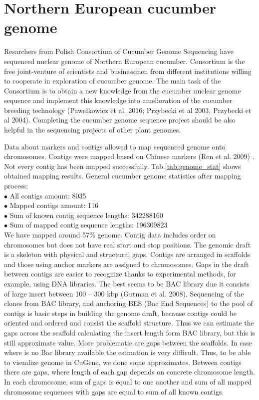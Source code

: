 \documentclass[a4paper]{spie}
\newcommand{\appName}{CuGene}
\begin{document}
\section{Northern European cucumber genome}
Resarchers from Polish Consortium of Cucumber Genome Sequencing have sequenced nuclear genome of Northern European cucumber.
Consortium is the free joint-venture of scientists and businessmen from different institutions willing to cooperate in exploration of cucumber genome. The main task of the Consortium is to obtain a new knowledge from the cucumber nuclear genome sequence and implement this knowledge into amelioration of the cucumber breeding technology (Pawełkowicz et al. 2016; Przybecki et al 2003, Przybecki et al 2004). Completing the cucumber genome sequence project should be also helpful in the sequencing projects of other plant genomes.

Data about markers and contigs allowed to map sequenced genome onto chromosomes. Contigs were mapped based on Chinese markers (Ren et al. 2009) . Not every contig has been mapped successfully. Tab.\ref{tab:genome_stat} shows obtained mapping results.
General cucumber genome statistics after mapping process:\\
$\bullet$ All contigs amount: 8035 \\
$\bullet$ Mapped contigs amount: 116 \\
$\bullet$ Sum of known contig sequence lengths: 342288160 \\
$\bullet$ Sum of mapped contig sequence lengths: 196309823 \\
We have mapped around 57\% genome. Contig data includes order on chromosomes but does not have real start and stop positions. The genomic draft is a skeleton with physical and structural gaps. Contigs  are arranged in scaffolds and those using anchor markers are assigned to chromosomes. Gaps in the draft between contigs are easier to recognize thanks to experimental methods, for example, using DNA libraries. The best seems to be BAC library due it consists of large insert  between 100 – 300 kbp (Gutman et al. 2008). Sequencing of the clones from BAC library, and anchoring BES (Bac End Sequences) to the pool of contigs is basic steps in building the genome draft, because contigs could be oriented and ordered and consist the scaffold structure. Thus we can estimate the gaps across the scaffold calculating the insert length form BAC library, but this is still approximate value. More problematic are gaps between the scaffolds. In case where is no Bac library available the estmation is very difficult. Thus, to be able to visualize genome in \appName{}, we done some approximates. Between contigs there are gaps, where length of each gap depends on concrete chromosome length. In each chromosome, sum of gaps is equal to one another and sum of all mapped chromosome sequences with gaps are equal to sum of all known contigs.
\end{document}
